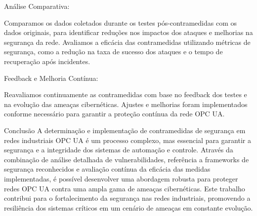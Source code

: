 {    Análise Comparativa:

    Comparamos os dados coletados durante os testes pós-contramedidas com os dados originais, para identificar reduções nos impactos dos ataques e melhorias na segurança da rede. Avaliamos a eficácia das contramedidas utilizando métricas de segurança, como a redução na taxa de sucesso dos ataques e o tempo de recuperação após incidentes.

    Feedback e Melhoria Contínua:

    Reavaliamos continuamente as contramedidas com base no feedback dos testes e na evolução das ameaças cibernéticas. Ajustes e melhorias foram implementados conforme necessário para garantir a proteção contínua da rede OPC UA.

    Conclusão
    A determinação e implementação de contramedidas de segurança em redes industriais OPC UA é um processo complexo, mas essencial para garantir a segurança e a integridade dos sistemas de automação e controle. Através da combinação de análise detalhada de vulnerabilidades, referência a frameworks de segurança reconhecidos e avaliação contínua da eficácia das medidas implementadas, é possível desenvolver uma abordagem robusta para proteger redes OPC UA contra uma ampla gama de ameaças cibernéticas. Este trabalho contribui para o fortalecimento da segurança nas redes industriais, promovendo a resiliência dos sistemas críticos em um cenário de ameaças em constante evolução.
    }
